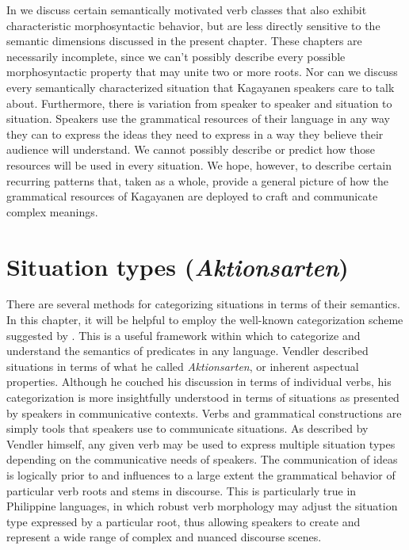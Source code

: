 In  we discuss certain semantically motivated verb classes that also exhibit characteristic morphosyntactic behavior, but are less directly sensitive to the semantic dimensions discussed in the present chapter. These chapters are necessarily incomplete, since we can’t possibly describe every possible morphosyntactic property that may unite two or more roots. Nor can we discuss every semantically characterized situation that Kagayanen speakers care to talk about. Furthermore, there is variation from speaker to speaker and situation to situation. Speakers use the grammatical resources of their language in any way they can to express the ideas they need to express in a way they believe their audience will understand. We cannot possibly describe or predict how those resources will be used in every situation. We hope, however, to describe certain recurring patterns that, taken as a whole, provide a general picture of how the grammatical resources of Kagayanen are deployed to craft and communicate complex meanings. 

\section{Situation types (\textit{Aktionsarten})}
\label{bkm:Ref148854086}
There are several methods for categorizing situations in terms of their semantics. In this chapter, it will be helpful to employ the well-known categorization scheme suggested by \citet{vendler1957}. This is a useful framework within which to categorize and understand the semantics of predicates in any language. Vendler described situations in terms of what he called \textit{Aktionsarten}, or inherent aspectual properties. Although he couched his discussion in terms of individual verbs, his categorization is more insightfully understood in terms of situations as presented by speakers in communicative contexts. Verbs and grammatical constructions are simply tools that speakers use to communicate situations. As described by Vendler himself, any given verb may be used to express multiple situation types depending on the communicative needs of speakers. The communication of ideas is logically prior to and influences to a large extent the grammatical behavior of particular verb roots and stems in discourse. This is particularly true in Philippine languages, in which robust verb morphology may adjust the situation type expressed by a particular root, thus allowing speakers to create and represent a wide range of complex and nuanced discourse scenes.

